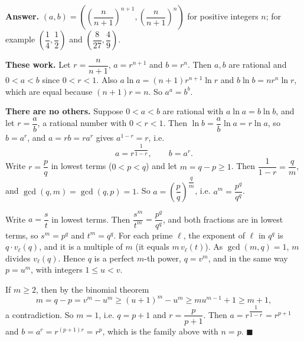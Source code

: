 \textbf{Answer.} $(a,b)=\left(\left(\dfrac{n}{n+1}\right)^{n+1},\left(\dfrac{n}{n+1}\right)^{n}\right)$ for positive integers $n$; for example $\left(\dfrac14,\dfrac12\right)$ and $\left(\dfrac{8}{27},\dfrac49\right)$.

\textbf{These work.} Let $r=\dfrac{n}{n+1}$, $a=r^{n+1}$ and $b=r^n$. Then $a,b$ are rational and $0<a<b$ since $0<r<1$. Also $a\ln a=(n+1)r^{n+1}\ln r$ and $b\ln b=nr^n\ln r$, which are equal because $(n+1)r=n$. So $a^a=b^b$.

\textbf{There are no others.} Suppose $0<a<b$ are rational with $a\ln a=b\ln b$, and let $r=\dfrac ab$, a rational number with $0<r<1$. Then $\ln b=\dfrac ab\ln a=r\ln a$, so $b=a^r$, and $a=rb=ra^r$ gives $a^{1-r}=r$, i.e.
\[a=r^{\dfrac{1}{1-r}},\qquad b=a^r.\]
Write $r=\dfrac pq$ in lowest terms ($0<p<q$) and let $m=q-p\ge1$. Then $\dfrac{1}{1-r}=\dfrac qm$, and $\gcd(q,m)=\gcd(q,p)=1$. So $a=\left(\dfrac pq\right)^{\dfrac qm}$, i.e. $a^m=\dfrac{p^q}{q^q}$.

Write $a=\dfrac st$ in lowest terms. Then $\dfrac{s^m}{t^m}=\dfrac{p^q}{q^q}$, and both fractions are in lowest terms, so $s^m=p^q$ and $t^m=q^q$. For each prime $\ell$, the exponent of $\ell$ in $q^q$ is $q\cdot v_\ell(q)$, and it is a multiple of $m$ (it equals $m\,v_\ell(t)$). As $\gcd(m,q)=1$, $m$ divides $v_\ell(q)$. Hence $q$ is a perfect $m$-th power, $q=v^m$, and in the same way $p=u^m$, with integers $1\le u<v$.

If $m\ge2$, then by the binomial theorem
\[m=q-p=v^m-u^m\ge(u+1)^m-u^m\ge mu^{m-1}+1\ge m+1,\]
a contradiction. So $m=1$, i.e. $q=p+1$ and $r=\dfrac{p}{p+1}$. Then $a=r^{\dfrac{1}{1-r}}=r^{p+1}$ and $b=a^r=r^{(p+1)r}=r^p$, which is the family above with $n=p$. $\blacksquare$
